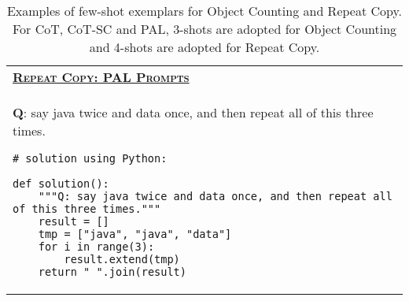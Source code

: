 \begin{table}[htbp]
\begin{tabular}{p{}}
\midrule
\underline{\textbf{\textsc{Repeat Copy: PAL Prompts}}} \\
 \textbf{Q}: say java twice and data once, and then repeat all of this three times.
\begin{verbatim}
# solution using Python:

def solution():
    """Q: say java twice and data once, and then repeat all of this three times."""
    result = []
    tmp = ["java", "java", "data"]
    for i in range(3):
        result.extend(tmp)
    return " ".join(result)
\end{verbatim}
        \\
        \bottomrule
    \end{tabular}
     \caption{Examples of few-shot exemplars for Object Counting and Repeat Copy. For CoT, CoT-SC and PAL,
     3-shots are adopted for Object Counting and 4-shots are adopted for Repeat Copy.}
    \label{tab:exp-obj-repeat}
\end{table}








